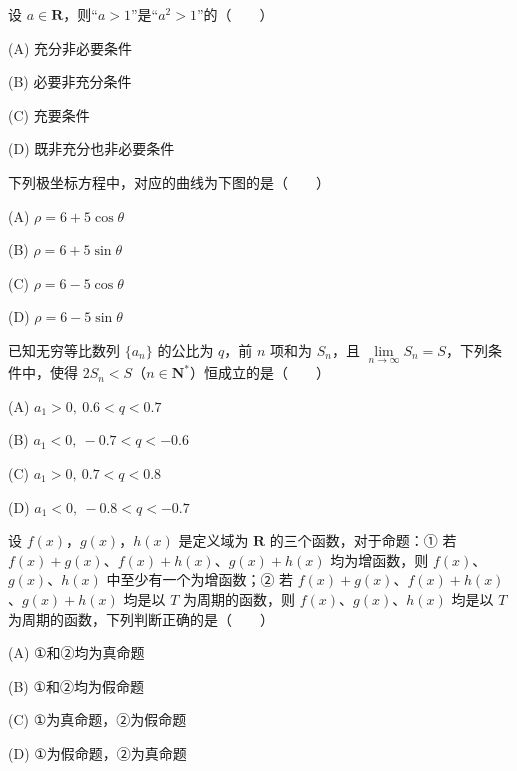 \begin{question}
设 \(a\in\mathbf{R}\)，则“\(a>1\)”是“\(a^2>1\)”的\mbox{（　　）}

\noindent(A) 充分非必要条件

\noindent(B) 必要非充分条件

\noindent(C) 充要条件

\noindent(D) 既非充分也非必要条件

\Needspace{0.4\textheight}
\end{question}
\begin{question}
下列极坐标方程中，对应的曲线为下图的是\mbox{（　　）}
\nopagebreak[4]
\begin{center}\end{center}
\nopagebreak[4]
\noindent(A) \(\rho=6+5\cos\theta\)

\noindent(B) \(\rho=6+5\sin\theta\)

\noindent(C) \(\rho=6-5\cos\theta\)

\noindent(D) \(\rho=6-5\sin\theta\)

\end{question}
\begin{question}
已知无穷等比数列 \(\{a_n\}\) 的公比为 \(q\)，前 \(n\) 项和为 \(S_n\)，且 \(\lim\limits_{n\to\infty}S_n=S\)，下列条件中，使得 \(2S_n<S\)（\(n\in\mathbf{N}^*\)）恒成立的是\mbox{（　　）}

\noindent(A) \(a_1>0,\ 0.6<q<0.7\)

\noindent(B) \(a_1<0,\ -0.7<q<-0.6\)

\noindent(C) \(a_1>0,\ 0.7<q<0.8\)

\noindent(D) \(a_1<0,\ -0.8<q<-0.7\)

\end{question}
\begin{question}
设 \(f(x)\)，\(g(x)\)，\(h(x)\) 是定义域为 \(\mathbf{R}\) 的三个函数，对于命题：① 若 \(f(x)+g(x)\)、\(f(x)+h(x)\)、\(g(x)+h(x)\) 均为增函数，则 \(f(x)\)、\(g(x)\)、\(h(x)\) 中至少有一个为增函数；② 若 \(f(x)+g(x)\)、\(f(x)+h(x)\)、\(g(x)+h(x)\) 均是以 \(T\) 为周期的函数，则 \(f(x)\)、\(g(x)\)、\(h(x)\) 均是以 \(T\) 为周期的函数，下列判断正确的是\mbox{（　　）}

\noindent(A) ①和②均为真命题

\noindent(B) ①和②均为假命题

\noindent(C) ①为真命题，②为假命题

\noindent(D) ①为假命题，②为真命题

\end{question}

